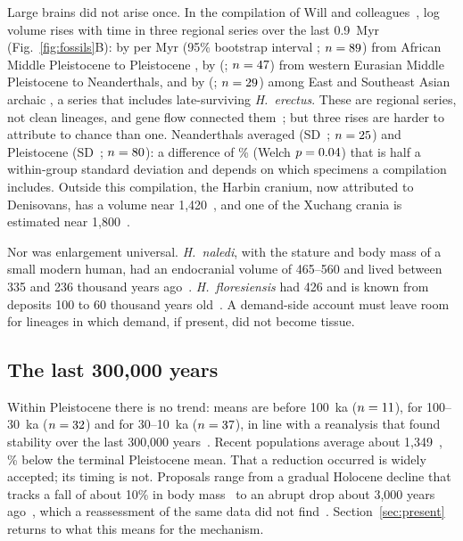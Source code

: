 Large brains did not arise once. In the compilation of Will and colleagues~\cite{will2021}, log volume rises with time in three regional series over the
last 0.9~Myr (Fig.~\ref{fig:fossils}B): by \SerAfr{} per Myr (95\% bootstrap interval \SerAfrCI; $n=89$) from African Middle
Pleistocene \Homo{} to Pleistocene \Hs, by \SerEur{} (\SerEurCI; $n=47$) from western Eurasian Middle Pleistocene \Homo{} to
Neanderthals, and by \SerAsia{} (\SerAsiaCI; $n=29$) among East and Southeast Asian archaic \Homo, a series that includes
late-surviving \textit{H.~erectus}. These are regional series, not clean lineages, and gene flow connected
them~\cite{green2010,prufer2014}; but three rises are harder to attribute to chance than one. Neanderthals averaged
\NeaMean\ccm{} (SD~\NeaSD; $n=25$) and Pleistocene \Hs{} \SapMean\ccm{} (SD~\SapSD; $n=80$): a difference of \WelchPct\%
(Welch $p=0.04$) that is half a within-group standard deviation and depends on which specimens a compilation includes.
Outside this compilation, the Harbin cranium, now attributed to Denisovans, has a volume near 1,420\ccm~\cite{ni2021,fu2025},
and one of the Xuchang crania is estimated near 1,800\ccm~\cite{li2017}.

Nor was enlargement universal. \textit{H.~naledi}, with the stature and body mass of a small modern human, had an endocranial
volume of 465--560\ccm{} and lived between 335 and 236 thousand years ago~\cite{berger2015,dirks2017}. \textit{H.~floresiensis}
had 426\ccm{} and is known from deposits 100 to 60 thousand years old~\cite{brown2004,kubo2013,sutikna2016}. A demand-side account must
leave room for lineages in which demand, if present, did not become tissue.

\subsection{The last 300,000 years}

Within Pleistocene \Hs{} there is no trend: means are \SapOld\ccm{} before 100~ka ($n=11$), \SapMid\ccm{} for
100--30~ka ($n=32$) and \SapLate\ccm{} for 30--10~ka ($n=37$), in line with a reanalysis that found stability over
the last 300,000 years~\cite{villmoare2022}. Recent populations average about 1,349\ccm~\cite{beals1984}, \RecentDrop\% below the
terminal Pleistocene mean. That a reduction occurred is widely accepted; its timing is not. Proposals range from a gradual
Holocene decline that tracks a fall of about 10\% in body mass~\cite{ruff1997} to an abrupt drop about 3,000 years
ago~\cite{desilva2021,desilva2023}, which a reassessment of the same data did not find~\cite{villmoare2022}.
Section~\ref{sec:present} returns to what this means for the mechanism.

